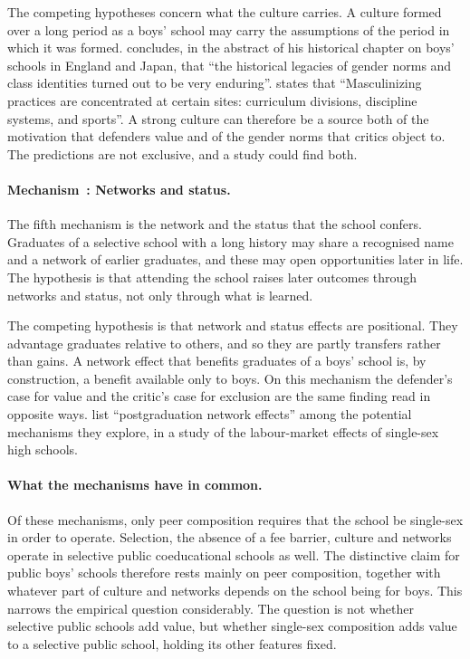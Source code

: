 \documentclass[11pt]{article}
\newcommand{\srcq}[2]{``#2''}
\newcounter{mech}
\newcommand{\mech}[1]{\refstepcounter{mech}\paragraph{Mechanism~\themech: #1.}}
\begin{document}
The competing hypotheses concern what the culture carries. A culture formed over a long period as a boys' school may carry the assumptions of the period in which it was formed. \citet{aspinall2024history} concludes, in the abstract of his historical chapter on boys' schools in England and Japan, that \srcq{aspinall2024history}{the historical legacies of gender norms and class identities turned out to be very enduring}. \citet{connell1996} states that \srcq{connell1996}{Masculinizing practices are concentrated at certain sites: curriculum divisions, discipline systems, and sports}. A strong culture can therefore be a source both of the motivation that defenders value and of the gender norms that critics object to. The predictions are not exclusive, and a study could find both.

\mech{Networks and status}\label{mech:networks}
The fifth mechanism is the network and the status that the school confers. Graduates of a selective school with a long history may share a recognised name and a network of earlier graduates, and these may open opportunities later in life. The hypothesis is that attending the school raises later outcomes through networks and status, not only through what is learned.

The competing hypothesis is that network and status effects are positional. They advantage graduates relative to others, and so they are partly transfers rather than gains. A network effect that benefits graduates of a boys' school is, by construction, a benefit available only to boys. On this mechanism the defender's case for value and the critic's case for exclusion are the same finding read in opposite ways. \citet{leenakazawa2021} list \srcq{leenakazawa2021}{postgraduation network effects} among the potential mechanisms they explore, in a study of the labour-market effects of single-sex high schools.

\paragraph{What the mechanisms have in common.} Of these mechanisms, only peer composition requires that the school be single-sex in order to operate. Selection, the absence of a fee barrier, culture and networks operate in selective public coeducational schools as well. The distinctive claim for public boys' schools therefore rests mainly on peer composition, together with whatever part of culture and networks depends on the school being for boys. This narrows the empirical question considerably. The question is not whether selective public schools add value, but whether single-sex composition adds value to a selective public school, holding its other features fixed.
\end{document}
